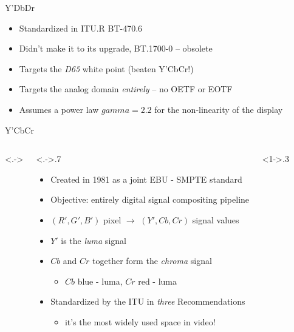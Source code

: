 \documentclass[aspectratio=169,handout,usepdftitle=false]{fireshonks}
\begin{document}
\begin{frame}{Y'DbDr}
    \begin{itemize}
        \item Standardized in ITU.R BT-470.6 \parencite*{BT470}
        \item Didn't make it to its upgrade, BT.1700-0 -- obsolete
        \item Targets the \emph{D65} white point (beaten Y'CbCr!)
        \item Targets the analog domain \emph{entirely} -- no OETF or EOTF
        \item Assumes a power law $gamma = 2.2$ for the non-linearity of the display
    \end{itemize}
\end{frame}
\begin{frame}{Y'CbCr}
    \begin{columns}<.->
        \begin{column}<.->{.7\textwidth}
            \begin{itemize}
                \item Created in 1981 as a joint EBU - SMPTE standard
                \item Objective: entirely digital signal compositing pipeline
                \item $(R', G', B')$ pixel $\rightarrow$ $(Y', Cb, Cr)$ signal values
                \item $Y'$ is the \emph{luma} signal
                \item $Cb$ and $Cr$ together form the \emph{chroma} signal
                      \begin{itemize}
                          \item $Cb$ blue - luma, $Cr$ red - luma
                      \end{itemize}
                \item Standardized by the ITU in \emph{three} Recommendations
                      \begin{itemize}
                          \item it's the most widely used space in video!
                      \end{itemize}
            \end{itemize}
        \end{column}
        \begin{column}<1->{.3\textwidth}
            \begin{figure}

\end{figure}
\end{column}
\end{columns}
\end{frame}
\end{document}
